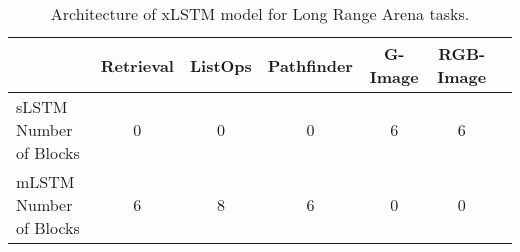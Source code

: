\begin{table}
    \centering
    \begin{tabular}{lcccccc}
    \toprule
    & \textbf{Retrieval} & \textbf{ListOps} & \textbf{Pathfinder} & \textbf{G-Image} & \textbf{RGB-Image} \\ 
    \midrule
sLSTM Number of Blocks & 0 & 0 & 0 & 6 & 6  \\ 
mLSTM Number of Blocks & 6 & 8 & 6 & 0 & 0 \\ 
\bottomrule
    \end{tabular}
    \caption{Architecture of xLSTM model for Long Range Arena tasks.  }
    \label{tab:lra_xlstm_hyperparameters}
\end{table}
